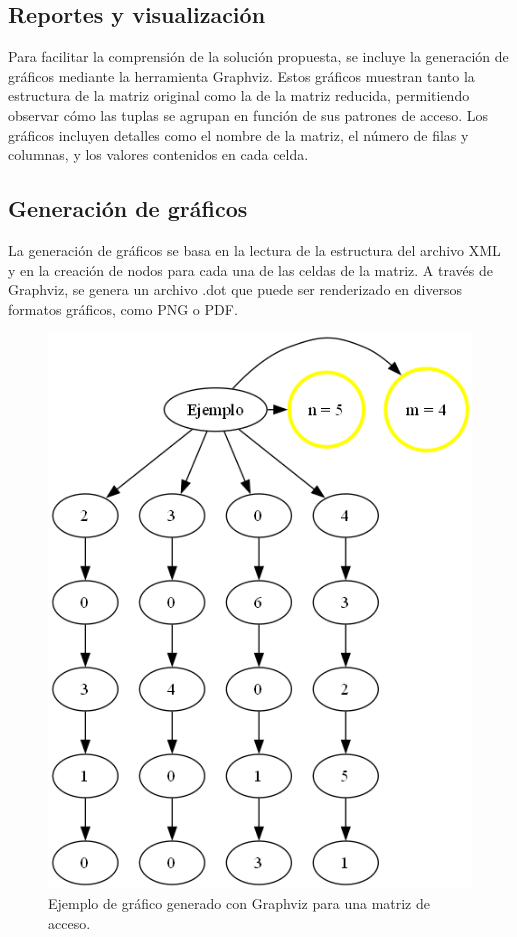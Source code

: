 \documentclass[letterpaper,12pt]{article}
\begin{document}
\begin{multicols}{2}
    \section*{Reportes y visualización}
    Para facilitar la comprensión de la solución propuesta, se incluye la generación de gráficos mediante la herramienta Graphviz. Estos gráficos muestran tanto la estructura de la matriz original como la de la matriz reducida, permitiendo observar cómo las tuplas se agrupan en función de sus patrones de acceso. Los gráficos incluyen detalles como el nombre de la matriz, el número de filas y columnas, y los valores contenidos en cada celda.

    \subsection*{Generación de gráficos}
    La generación de gráficos se basa en la lectura de la estructura del archivo XML y en la creación de nodos para cada una de las celdas de la matriz. A través de Graphviz, se genera un archivo .dot que puede ser renderizado en diversos formatos gráficos, como PNG o PDF.

    \begin{figure}[H]
        \centering
        \includegraphics[width=\columnwidth]{images/matrix_graph_Ejemplo.png}
        \caption{Ejemplo de gráfico generado con Graphviz para una matriz de acceso.}
    \end{figure}


\end{multicols}
\end{document}
